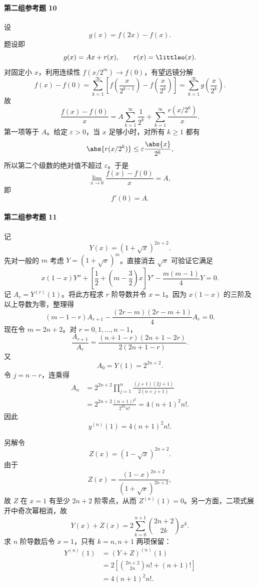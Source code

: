 \paragraph{第二组参考题 10}
\begin{xsolution}
设
\[
  g(x)=f(2x)-f(x).
\]
题设即
\[
  g(x)=Ax+r(x),\qquad r(x)=\littleo(x).
\]
对固定小 $x$，利用连续性 $f(x/2^m)\to f(0)$，有望远镜分解
\[
  f(x)-f(0)
  =\sum_{k=1}^{\infty}
  \left[f\left(\frac{x}{2^{k-1}}\right)-f\left(\frac{x}{2^k}\right)\right]
  =\sum_{k=1}^{\infty}g\left(\frac{x}{2^k}\right).
\]
故
\[
  \frac{f(x)-f(0)}x
  =A\sum_{k=1}^{\infty}\frac1{2^k}
   +\sum_{k=1}^{\infty}\frac{r(x/2^k)}x.
\]
第一项等于 $A$。给定 $\varepsilon>0$，当 $x$ 足够小时，对所有 $k\ge1$ 都有
\[
  \abs{r(x/2^k)}\le\varepsilon\frac{\abs{x}}{2^k},
\]
所以第二个级数的绝对值不超过 $\varepsilon$。于是
\[
  \lim_{x\to0}\frac{f(x)-f(0)}x=A,
\]
即
\[
  \boxed{f'(0)=A}.
\]
\end{xsolution}

\paragraph{第二组参考题 11}
\begin{xsolution}
记
\[
  Y(x)=(1+\sqrt{x})^{2n+2}.
\]
先对一般的 $m$ 考虑 $Y=(1+\sqrt{x})^m$。直接消去 $\sqrt{x}$ 可验证它满足
\[
  x(1-x)Y''+\left[\frac12+\left(m-\frac32\right)x\right]Y'
  -\frac{m(m-1)}4Y=0.
\]
记 $A_r=Y^{(r)}(1)$。将此方程求 $r$ 阶导数并令 $x=1$。因为 $x(1-x)$ 的三阶及以上导数为零，整理得
\[
  (m-1-r)A_{r+1}
  -\frac{(2r-m)(2r-m+1)}4A_r=0.
\]
现在令 $m=2n+2$。对 $r=0,1,\ldots,n-1$，
\[
  \frac{A_{r+1}}{A_r}
  =\frac{(n+1-r)(2n+1-2r)}{2(2n+1-r)}.
\]
又
\[
  A_0=Y(1)=2^{2n+2}.
\]
令 $j=n-r$，连乘得
\begin{align*}
  A_n
  &=2^{2n+2}
    \prod_{j=1}^{n}\frac{(j+1)(2j+1)}{2(n+j+1)}\\
  &=2^{2n+2}
    \frac{(n+1)!^2}{2^{2n}n!}
   =4(n+1)^2n!.
\end{align*}
因此
\[
  \boxed{y^{(n)}(1)=4(n+1)^2n!}.
\]

另解\quad 令
\[
  Z(x)=(1-\sqrt{x})^{2n+2}.
\]
由于
\[
  Z(x)=\frac{(1-x)^{2n+2}}{(1+\sqrt{x})^{2n+2}},
\]
故 $Z$ 在 $x=1$ 有至少 $2n+2$ 阶零点，从而 $Z^{(n)}(1)=0$。另一方面，二项式展开中奇次幂相消，故
\[
  Y(x)+Z(x)
  =2\sum_{k=0}^{n+1}\binom{2n+2}{2k}x^k.
\]
求 $n$ 阶导数后令 $x=1$，只有 $k=n,n+1$ 两项保留：
\begin{align*}
  Y^{(n)}(1)
  &=(Y+Z)^{(n)}(1)\\
  &=2\left[\binom{2n+2}{2n}n!+(n+1)!\right]\\
  &=4(n+1)^2n!.
\end{align*}
\end{xsolution}

